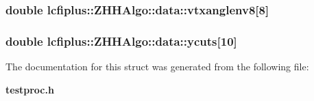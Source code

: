 \subsubsection[{vtxanglenv8}]{\setlength{\rightskip}{0pt plus 5cm}double lcfiplus\-::\-Z\-H\-H\-Algo\-::data\-::vtxanglenv8[8]}\label{structlcfiplus_1_1ZHHAlgo_1_1data_af6fcc97ed7dce4845fc1e126654b2af3}
\subsubsection[{ycuts}]{\setlength{\rightskip}{0pt plus 5cm}double lcfiplus\-::\-Z\-H\-H\-Algo\-::data\-::ycuts[10]}\label{structlcfiplus_1_1ZHHAlgo_1_1data_ac3334eccf9ac3625a48b9c0919bb465b}


The documentation for this struct was generated from the following file\-:\begin{DoxyCompactItemize}
\item 
{\bf testproc.\-h}\end{DoxyCompactItemize}
